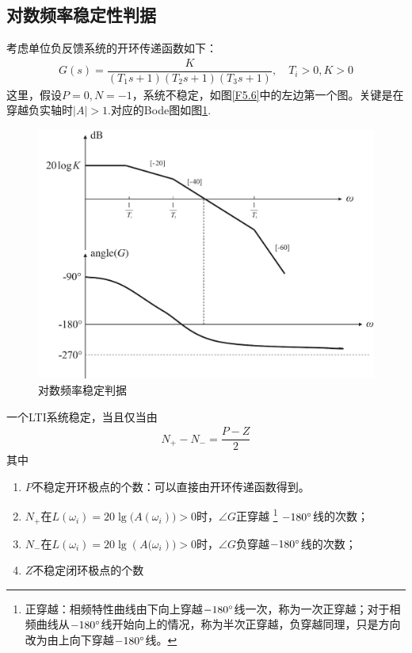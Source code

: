 \subsection{对数频率稳定性判据}
考虑单位负反馈系统的开环传递函数如下：
\begin{align*}
	G(s) = \dfrac{K}{(T_1s+1)(T_2s+1)(T_3s+1)}, \quad T_i > 0, K>0
\end{align*}
这里，假设$P=0,N=-1$，系统不稳定，如图\ref{F5.6}中的左边第一个图。关键是在穿越负实轴时$|A|>1$.对应的Bode图如图\ref{对数稳定}.
\begin{figure}[!htb]
	\centering
	\includegraphics[width=0.7\linewidth]{pic/对数判据.pdf}
	\caption{对数频率稳定判据}
	\label{对数稳定}
\end{figure}

\theorem[对数频率稳定判据]
一个LTI系统稳定，当且仅当由
\begin{align}
	N_+  - N_- = \dfrac{P - Z}{2}
\end{align}
其中
\vspace*{-0.5em}
\begin{enumerate}[\hspace*{2em}]
	\item $P$\quad 不稳定开环极点的个数：可以直接由开环传递函数得到。\vspace*{-0.5em}
	
	\item $N_+$\quad 在$L(\omega_i) = 20\lg\big(A(\omega_i)\big) > 0$时，$\angle G$正穿越
	\footnote{正穿越：相频特性曲线由下向上穿越$-180{}^{\circ}$线一次，称为一次正穿越；对于相频曲线从$-180{}^{\circ}$线开始向上的情况，称为半次正穿越，负穿越同理，只是方向改为由上向下穿越$-180{}^{\circ}$线。}
	$-180{}^{\circ}$线的次数；\vspace*{-0.5em}
	
	\item $N_-$\quad 在$L(\omega_i) = 20\lg(A\big(\omega_i)\big) > 0$时，$\angle G$负穿越$-180{}^{\circ}$线的次数；\vspace*{-0.5em}
	
	\item $Z$\quad 不稳定闭环极点的个数
	
\end{enumerate}

